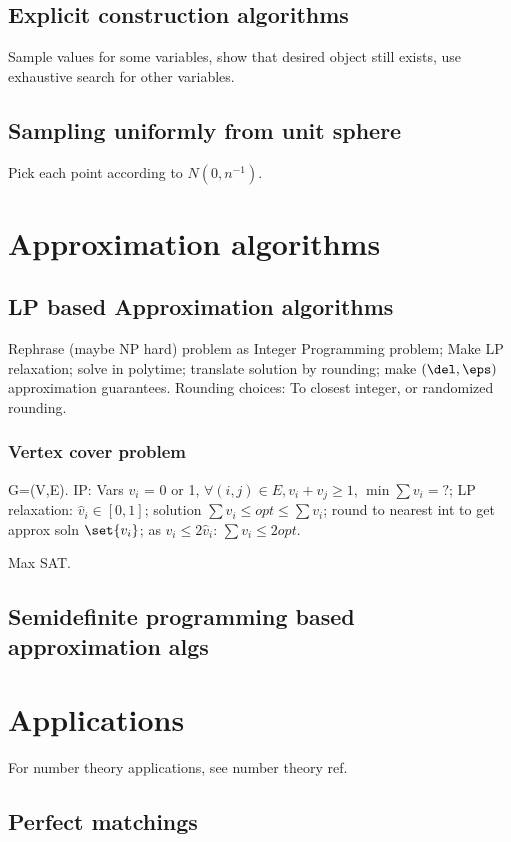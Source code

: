 \documentclass[oneside, article]{memoir}
\begin{document}
\section{Explicit construction algorithms}
Sample values for some variables, show that desired object still exists, use exhaustive search for other variables.

\section{Sampling uniformly from unit sphere}
Pick each point according to $N(0, n^{-1})$. \why

\chapter{Approximation algorithms}
\section{LP based Approximation algorithms}
Rephrase (maybe NP hard) problem as Integer Programming problem; Make LP relaxation; solve in polytime; translate solution by rounding; make $(\del, \eps)$ approximation guarantees. Rounding choices: To closest integer, or randomized rounding.

\subsection{Vertex cover problem}
G=(V,E). IP: Vars $v_{i}$ = 0 or 1, $\forall (i,j) \in E, v_{i}+v_{j} \geq 1$, $\min \sum v_{i} = ?$; LP relaxation: $\hat{v}_{i} \in [0,1]$; solution $\sum \hat{v}_{i} \leq opt \leq \sum v_{i}$; round to nearest int to get approx soln $\set{v_{i}}$; as $v_{i} \leq 2 \hat{v}_{i}$: $\sum v_{i} \leq 2 opt$.

Max SAT.

\tbc

\section{Semidefinite programming based approximation algs}

\tbc

\chapter{Applications}
For number theory applications, see number theory ref.

\section{Perfect matchings}
\end{document}
